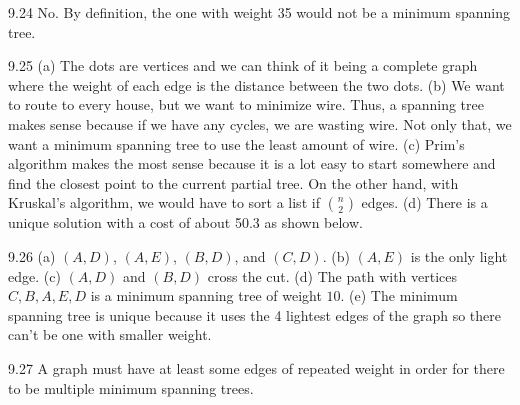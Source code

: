 \begin{RequAnswer}{9.24}
No. By definition, the one with weight 35 would not be a minimum spanning tree.
\end{RequAnswer}
\begin{RequAnswer}{9.25}
(a) The dots are vertices and we can think of it being a complete
graph where the weight of each edge is the distance between
the two dots.
(b) We want to route to every house, but we want to minimize
wire. Thus, a spanning tree makes sense because if we have any
cycles, we are wasting wire. Not only that, we want a minimum
spanning tree to use the least amount of wire.
(c) Prim's algorithm makes the most sense because it is a lot
easy to start somewhere and find the closest point to the
current partial tree. On the other hand, with Kruskal's algorithm,
we would have to sort a list if $\binom{n}{2}$ edges.
(d) There is a unique solution with a cost of about 50.3 as shown below.

\end{RequAnswer}
\begin{RequAnswer}{9.26}
(a) $(A,D)$, $(A,E)$, $(B,D)$, and $(C,D)$.
(b) $(A,E)$ is the only light edge.
(c) $(A,D)$ and $(B,D)$ cross the cut.
(d) The path with vertices $C, B, A, E, D$ is a minimum spanning tree
of weight $10$.
(e) The minimum spanning tree is unique because it uses the 4
lightest edges of the graph so there can't be one with smaller weight.
\end{RequAnswer}
\begin{RequAnswer}{9.27}
A graph must have at least some edges of repeated weight
in order for there to be multiple minimum spanning trees.
\end{RequAnswer}
